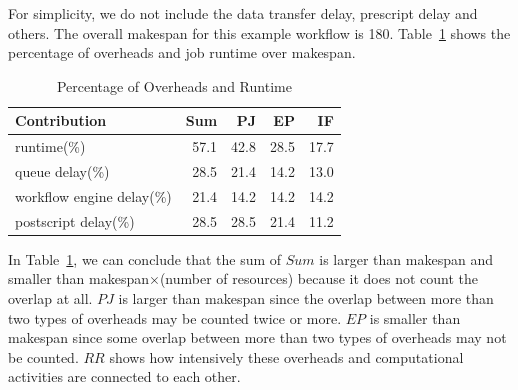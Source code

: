 


For simplicity, we do not include the data transfer delay, prescript delay and others. The overall makespan for this example workflow is 180. Table~\ref{tab:model_percentage_overhead} shows the percentage of overheads and job runtime over makespan.  

\begin{table}[h!]
\caption{Percentage of Overheads and Runtime}
\label{tab:model_percentage_overhead}
\centering
\begin{tabular}{lrrrr}
\hline
Contribution & Sum & PJ & EP &IF\\

\hline

runtime(\%) & 57.1 & 42.8 & 28.5 &17.7 \\
queue delay(\%) & 28.5 &21.4 &14.2 &13.0 \\
workflow engine delay(\%) & 21.4 &14.2& 14.2 &14.2\\
postscript delay(\%) & 28.5 & 28.5 & 21.4 & 11.2 \\
\hline
\end{tabular}
\end{table} 


In Table~\ref{tab:model_percentage_overhead}, we can conclude that the sum of $Sum$ is larger than makespan and smaller than makespan$\times$(number of resources) because it does not count the overlap at all. $PJ$ is larger than makespan since the overlap between more than two types of overheads may be counted twice or more. $EP$ is smaller than makespan since some overlap between more than two types of overheads may not be counted.  $RR$ shows how intensively these overheads and computational activities are connected to each other. 

